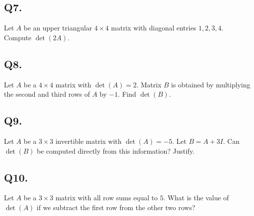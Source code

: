 \subsection*{Q7.}
Let $A$ be an upper triangular $4 \times 4$ matrix with diagonal entries $1, 2, 3, 4$. Compute $\det(2A)$.

\subsection*{Q8.}
Let $A$ be a $4 \times 4$ matrix with $\det(A) = 2$. Matrix $B$ is obtained by multiplying the second and third rows of $A$ by $-1$. Find $\det(B)$.

\subsection*{Q9.}
Let $A$ be a $3 \times 3$ invertible matrix with $\det(A) = -5$. Let $B = A + 3I$. Can $\det(B)$ be computed directly from this information? Justify.

\subsection*{Q10.}
Let $A$ be a $3 \times 3$ matrix with all row sums equal to $5$. What is the value of $\det(A)$ if we subtract the first row from the other two rows?

